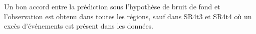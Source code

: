 Un bon accord entre la pr\'ediction sous l'hypoth\`ese de bruit de fond et l'observation est obtenu dans toutes les r\'egions, sauf dans SR4t3 et SR4t4 o\`u un exc\`es d'\'ev\'enements est pr\'esent dans les donn\'ees. 

